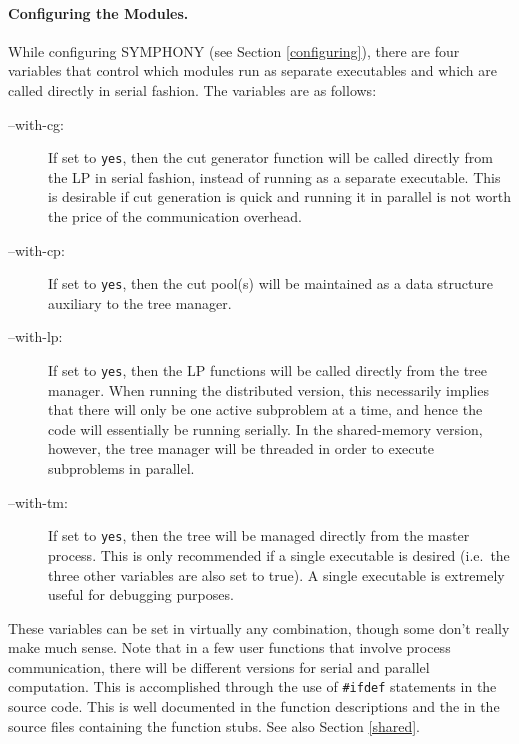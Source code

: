 \paragraph{Configuring the Modules.}
\label{configuration}
While configuring SYMPHONY (see Section \ref{configuring}), there 
are four variables that control which modules run as separate executables and
which are called directly in serial fashion. The variables are as follows:
\begin{description}
        \item [--with-cg:] If set to {\tt yes}, then the cut generator
        function will be called directly from the LP in serial
        fashion, instead of running as a separate executable. This is
        desirable if cut generation is quick and running it in
        parallel is not worth the price of the communication overhead.
        \item [--with-cp:] If set to {\tt yes}, then the cut
        pool(s) will be maintained as a data structure auxiliary to the
        tree manager. 
        \item [--with-lp:] If set to {\tt yes}, then the LP
        functions will be called directly from the tree manager. When
        running the distributed version, this
        necessarily implies that there will only be one active
        subproblem at a time, and hence the code will essentially be
        running serially. In the shared-memory version, however, the
        tree manager will be threaded in order to execute subproblems 
        in parallel.
        \item [--with-tm:] If set to {\tt yes}, then the tree
        will be managed directly from the master process. This is only
        recommended if a single executable is desired (i.e.~the three
        other variables are also set to true). A single executable is
        extremely useful for debugging purposes.
\end{description}
These variables can be set in virtually any combination, though some
don't really make much sense. Note that in a few user functions that
involve process communication, there will be different versions for
serial and parallel computation. This is accomplished through the use
of {\tt \#ifdef} statements in the source code. This is well documented
in the function descriptions and the in the source files containing
the function stubs. See also Section \ref{shared}.

